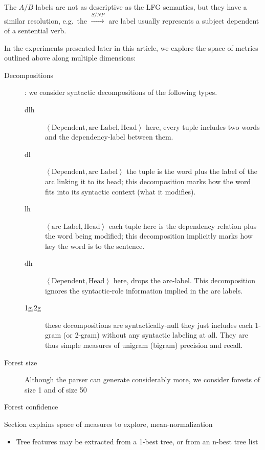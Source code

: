 \documentclass{kluwer}    %
\begin{document}
\begin{article}
The $A/B$ labels are not as descriptive as the LFG semantics, but they
have a similar resolution, e.g.\ the $\stackrel{S/NP}{\to}$ arc label
usually represents a subject dependent of a sentential verb.


In the experiments presented later in this article, we explore the
space of metrics outlined above along multiple dimensions:
\begin{description}
\item[Decompositions]: we consider syntactic decompositions of the
  following types.
  \begin{description}
  \item[dlh] $\left\langle \textrm{Dependent}, \textrm{arc Label},
      \textrm{Head}\right\rangle$ here, every tuple includes two words
    and the dependency-label between them.
  \item[dl] $\left\langle \textrm{Dependent}, \textrm{arc Label}
      \right\rangle$ the tuple is the word plus the label of the arc
      linking it to its head; this decomposition marks how the word
      fits into its syntactic context (what it modifies).
    \item[lh] $\left\langle \textrm{arc Label}, \textrm{Head}
      \right\rangle$ each tuple here is the dependency relation plus
      the word being modified; this decomposition implicitly marks how
      key the word is to the sentence.
    \item[dh] $\left\langle \textrm{Dependent}, \textrm{Head}
      \right\rangle$ here, drops the arc-label. This decomposition
      ignores the syntactic-role information implied in the arc labels.
    \item[1g,2g] these decompositions are syntactically-null
      they just includes each 1-gram (or 2-gram) without any
      syntactic labeling at all.  They are thus simple measures of
      unigram (bigram)
      precision and recall.
  \end{description}
\item[Forest size]
Although the parser can generate considerably more, we consider forests of size 1 and of size 50
\item[Forest confidence]
\end{description}

Section explains space of measures to explore, mean-normalization

\begin{itemize}
    
\item Tree features may be extracted from a 1-best tree, or from an
  n-best tree list 


\end{itemize}
\end{article}
\end{document}
